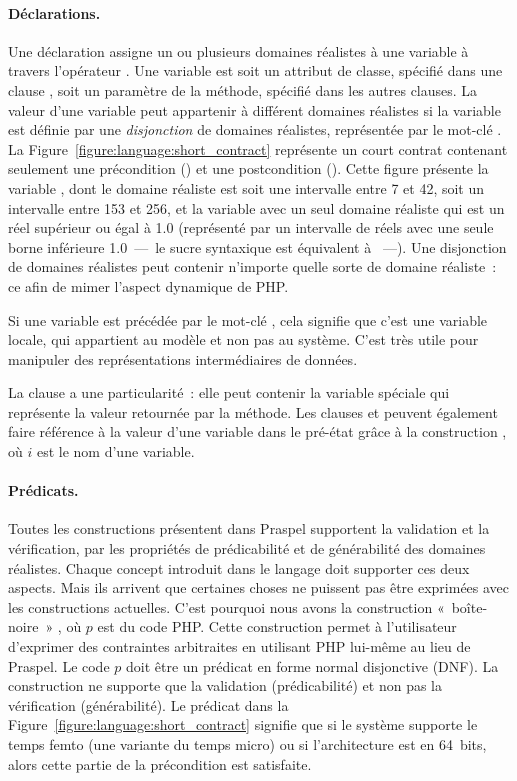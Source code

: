 \paragraph{Déclarations.} Une déclaration assigne un ou plusieurs domaines
réalistes à une variable à travers l'opérateur \code{:}. Une variable est soit
un attribut de classe, spécifié dans une clause \ainvariant, soit un paramètre
de la méthode, spécifié dans les autres clauses. La valeur d'une variable peut
appartenir à différent domaines réalistes si la variable est définie par une
{\em disjonction} de domaines réalistes, représentée par le mot-clé .
La Figure~\ref{figure:language:short_contract} représente un court contrat
contenant seulement une précondition (\arequires) et une postcondition
(\aensures). Cette figure présente la variable , dont le domaine
réaliste est soit une intervalle entre 7 et 42, soit un intervalle entre 153 et
256, et la variable  avec un seul domaine réaliste qui est un réel
supérieur ou égal à 1.0 (représenté par un intervalle de réels avec une seule
borne inférieure 1.0~—~le sucre syntaxique  est équivalent à
~—). Une disjonction de domaines réalistes peut
contenir n'importe quelle sorte de domaine réaliste~: ce afin de mimer l'aspect
dynamique de PHP.

Si une variable est précédée par le mot-clé , cela signifie que c'est
une variable locale, qui appartient au modèle et non pas au système. C'est très
utile pour manipuler des représentations intermédiaires de données.

La clause \aensures a une particularité~: elle peut contenir la variable
spéciale \aresult qui représente la valeur retournée par la méthode. Les clauses
\aensures et \athrowable peuvent également faire référence à la valeur d'une
variable dans le pré-état grâce à la construction , où $i$ est le nom
d'une variable.

\paragraph{Prédicats.} Toutes les constructions présentent dans Praspel
supportent la validation et la vérification, \ie par les propriétés de
prédicabilité et de générabilité des domaines réalistes. Chaque concept
introduit dans le langage doit supporter ces deux aspects. Mais ils arrivent que
certaines choses ne puissent pas être exprimées avec les constructions
actuelles. C'est pourquoi nous avons la construction «~boîte-noire~» ,
où $p$ est du code PHP. Cette construction permet à l'utilisateur d'exprimer des
contraintes arbitraites en utilisant PHP lui-même au lieu de Praspel. Le code
$p$ doit être un prédicat en forme normal disjonctive (DNF). La construction
\apred{\empty} ne supporte que la validation (prédicabilité) et non pas la
vérification (générabilité). Le prédicat  dans la Figure~\ref{figure:language:short_contract} signifie que
si le système supporte le temps femto (une variante du temps micro) ou si
l'architecture est en 64~bits, alors cette partie de la précondition est
satisfaite.

